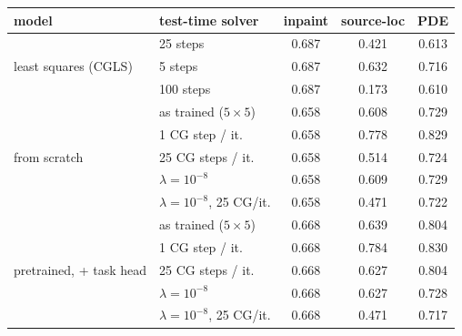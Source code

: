 \begin{tabular}{llccc}
\toprule
model & test-time solver & inpaint & source-loc & PDE \\
\midrule
\multirow{3}{*}{least squares (CGLS)} & 25 steps & 0.687 & 0.421 & 0.613 \\
 & 5 steps & 0.687 & 0.632 & 0.716 \\
 & 100 steps & 0.687 & 0.173 & 0.610 \\
\midrule
\multirow{5}{*}{from scratch} & as trained ($5 \times 5$) & 0.658 & 0.608 & 0.729 \\
 & 1 CG step / it. & 0.658 & 0.778 & 0.829 \\
 & 25 CG steps / it. & 0.658 & 0.514 & 0.724 \\
 & $\lambda = 10^{-8}$ & 0.658 & 0.609 & 0.729 \\
 & $\lambda = 10^{-8}$, 25 CG/it. & 0.658 & 0.471 & 0.722 \\
\midrule
\multirow{5}{*}{pretrained, + task head} & as trained ($5 \times 5$) & 0.668 & 0.639 & 0.804 \\
 & 1 CG step / it. & 0.668 & 0.784 & 0.830 \\
 & 25 CG steps / it. & 0.668 & 0.627 & 0.804 \\
 & $\lambda = 10^{-8}$ & 0.668 & 0.627 & 0.728 \\
 & $\lambda = 10^{-8}$, 25 CG/it. & 0.668 & 0.471 & 0.717 \\
\bottomrule
\end{tabular}
